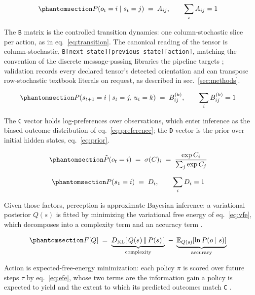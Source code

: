 \documentclass[
  english,
  9pt,
]{extarticle}
\begin{document}
\begin{equation}\protect\phantomsection\label{eq:likelihood}{
P(o_t = i \mid s_t = j) \;=\; A_{ij}, \qquad \sum_i A_{ij} = 1
}\end{equation}

The \texttt{B} matrix is the controlled transition dynamics: one
column-stochastic slice per action, as in eq.~\ref{eq:transition}. The
canonical reading of the tensor is column-stochastic,
\texttt{B{[}next\_state{]}{[}previous\_state{]}{[}action{]}}, matching
the convention of the discrete message-passing libraries the pipeline
targets \citep{heins2022}; validation records every declared tensor's
detected orientation and can transpose row-stochastic textbook literals
on request, as described in sec.~\ref{sec:methods}.

\begin{equation}\protect\phantomsection\label{eq:transition}{
P(s_{t+1} = i \mid s_t = j,\, u_t = k) \;=\; B^{(k)}_{ij}, \qquad \sum_i B^{(k)}_{ij} = 1
}\end{equation}

The \texttt{C} vector holds log-preferences over observations, which
enter inference as the biased outcome distribution of
eq.~\ref{eq:preference}; the \texttt{D} vector is the prior over initial
hidden states, eq.~\ref{eq:prior}.

\begin{equation}\protect\phantomsection\label{eq:preference}{
\tilde{P}(o_t = i) \;=\; \sigma(C)_i \;=\; \frac{\exp C_i}{\sum_j \exp C_j}
}\end{equation}

\begin{equation}\protect\phantomsection\label{eq:prior}{
P(s_1 = i) \;=\; D_i, \qquad \sum_i D_i = 1
}\end{equation}

Given those factors, perception is approximate Bayesian inference: a
variational posterior \(Q(s)\) is fitted by minimizing the variational
free energy of eq.~\ref{eq:vfe}, which decomposes into a complexity term
and an accuracy term \citep{friston2010}.

\begin{equation}\protect\phantomsection\label{eq:vfe}{
F[Q] \;=\; \underbrace{D_{\mathrm{KL}}\!\left[\,Q(s) \,\|\, P(s)\,\right]}_{\text{complexity}} \;-\; \underbrace{\mathbb{E}_{Q(s)}\!\left[\ln P(o \mid s)\right]}_{\text{accuracy}}
}\end{equation}

Action is expected-free-energy minimization: each policy \(\pi\) is
scored over future steps \(\tau\) by eq.~\ref{eq:efe}, whose two terms
are the information gain a policy is expected to yield and the extent to
which its predicted outcomes match \texttt{C} \citep{dacosta2020}.
\end{document}
